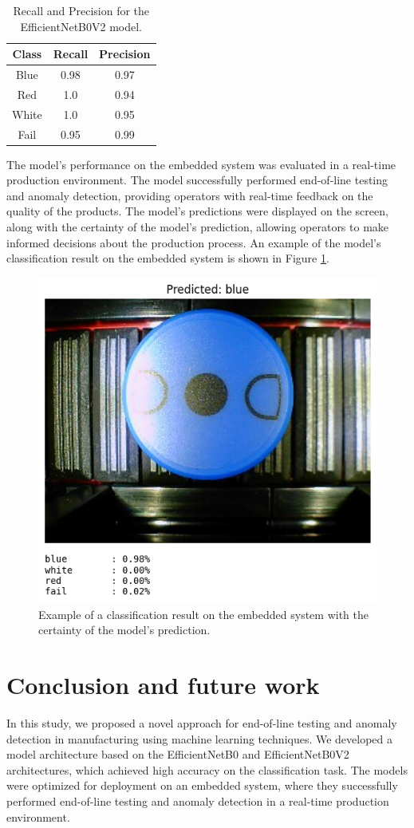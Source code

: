 \documentclass[lettersize,journal]{IEEEtran}
\begin{document}
\begin{table}[!h]
  \centering
  \caption{Recall and Precision for the EfficientNetB0V2 model.}
  \begin{tabular}{|c|c|c|}
    \hline
    \textbf{Class} & \textbf{Recall} & \textbf{Precision} \\
    \hline
    Blue & 0.98 & 0.97 \\
    Red & 1.0 & 0.94 \\
    White & 1.0 & 0.95 \\
    Fail & 0.95 & 0.99 \\
    \hline
  \end{tabular}
  \label{tab:recall_precision}
\end{table}

The model's performance on the embedded system was evaluated in a real-time production environment. The model successfully performed end-of-line testing and anomaly detection, providing operators with real-time feedback on the quality of the products. The model's predictions were displayed on the screen, along with the certainty of the model's prediction, allowing operators to make informed decisions about the production process. An example of the model's classification result on the embedded system is shown in Figure \ref{fig:loss_accuracy}.

\begin{figure}[!h]
  \centering
  \includegraphics[width=.4\textwidth]{images/classification.png}
  \caption{Example of a classification result on the embedded system with the certainty of the model's prediction.}
  \label{fig:loss_accuracy}
\end{figure}



\section{Conclusion and future work}

In this study, we proposed a novel approach for end-of-line testing and anomaly detection in manufacturing using machine learning techniques. We developed a model architecture based on the EfficientNetB0 and EfficientNetB0V2 architectures, which achieved high accuracy on the classification task. The models were optimized for deployment on an embedded system, where they successfully performed end-of-line testing and anomaly detection in a real-time production environment.
\end{document}

